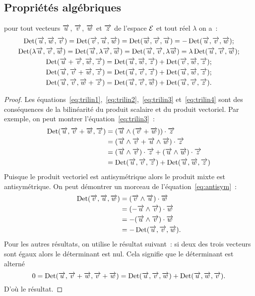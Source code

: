 \subsection{Propriétés algébriques}
\begin{prop}
  pour tout vecteurs \(\vu\), \(\vv\), \(\vw\) et \( \vz\) de l'espace \(\E\) 
  et tout réel \(\lambda\) on a~:
  \begin{gather}
    \Det(\vu, \vw, \vv) = \Det(\vv, \vu, \vw) = \Det(\vw, \vv, \vu) = 
    -\Det(\vu, \vv, \vw) \label{eq:antisym};\\
    \Det(\lambda\vu, \vv, \vw) = \Det(\vu, \lambda\vv, \vw) = \Det(\vu, \vv, 
    \lambda\vw) = \lambda\Det(\vu, \vv, \vw)\label{eq:trilin1};\\
    \Det(\vu + \vv, \vw, \vz) = \Det(\vu, \vw, \vz) + \Det(\vv, \vw, \vz) 
    \label{eq:trilin2};\\
    \Det(\vu, \vv + \vw, \vz) = \Det(\vu, \vv, \vz) + \Det(\vu, \vw, \vz) 
    \label{eq:trilin3};\\
    \Det(\vu, \vv, \vw + \vz) = \Det(\vu, \vv, \vw) + \Det(\vu, \vv, \vz) 
    \label{eq:trilin4}.
  \end{gather}
\end{prop}

\begin{proof}
  Les équations~\eqref{eq:trilin1},~\eqref{eq:trilin2},~\eqref{eq:trilin3} 
  et~\eqref{eq:trilin4} sont des conséquences de la bilinéarité du produit 
  scalaire et du produit vectoriel. Par exemple, on peut montrer 
  l'équation~\eqref{eq:trilin3}~:
  \begin{align}
    \Det(\vu, \vv + \vw, \vz)
    & = (\vu\wedge(\vv + \vw))\cdot\vz\\
    & = (\vu\wedge\vv + \vu\wedge\vw)\cdot\vz\\
    & = (\vu\wedge\vv)\cdot\vz + (\vu\wedge\vw)\cdot\vz\\
    & = \Det(\vu, \vv, \vz) + \Det(\vu, \vw, \vz)
  \end{align}
  Puisque le produit vectoriel est antisymétrique alors le produit mixte est 
  antisymétrique. On peut démontrer un morceau de 
  l'équation~\eqref{eq:antisym}~:
  \begin{align}
    \Det(\vv, \vu, \vw)& =(\vv\wedge\vu)\cdot\vw\\
                       & =(-\vu\wedge\vv)\cdot\vw\\
                       & =-(\vu\wedge\vv)\cdot\vw\\
                       & =-\Det(\vu, \vv, \vw).
  \end{align}
  Pour les autres résultats, on utilise le résultat suivant~: si deux des 
  trois vecteurs sont égaux alors le déterminant est nul. Cela signifie que le 
  déterminant est alterné
  \begin{equation}
    0 = \Det(\vu, \vv + \vw, \vv + \vw) = \Det(\vu, \vv, \vw) + \Det(\vu, \vw, 
    \vv).
  \end{equation}
  D'où le résultat.
\end{proof}

